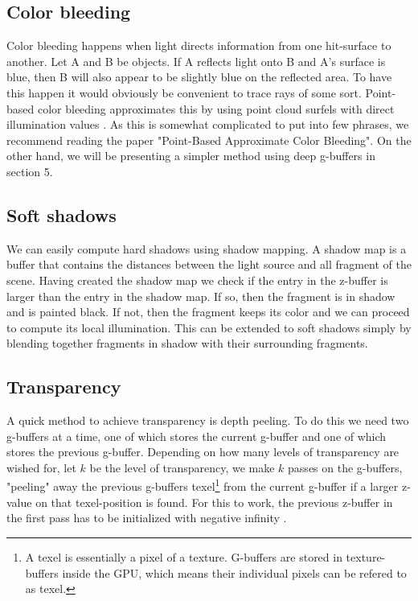 \documentclass{ACGSeminar}
\begin{document}
	\subsection{Color bleeding}
		Color bleeding happens when light directs information from one hit-surface to another. Let A and B be objects. If A reflects light onto B and A's surface is blue, then B will also appear
		to be slightly blue on the reflected area. To have this happen it would obviously be convenient to trace rays of some sort. Point-based color bleeding approximates this by using point cloud surfels with direct illumination values \cite{PBCB}. As this is somewhat complicated to put into few phrases, we recommend reading the paper "Point-Based Approximate Color Bleeding". On the other hand, we will be presenting a simpler method using deep g-buffers in section 5.

	\subsection{Soft shadows}
		We can easily compute hard shadows using shadow mapping. A shadow map is a buffer that contains the distances between the light source and all fragment of the scene. Having created the shadow map we check if the entry in the z-buffer is larger than the entry in the shadow map. If so, then the fragment is in shadow and is painted black. If not, then the fragment keeps its color and we can proceed to compute its local illumination. This can be extended to soft shadows simply by blending together fragments in shadow with their surrounding fragments.

	\subsection{Transparency}
		A quick method to achieve transparency is depth peeling. To do this we need two g-buffers at a time, one of which stores the current g-buffer and one of which stores the previous g-buffer. Depending on how many levels of transparency are wished for, let $k$ be the level of transparency, we make $k$ passes on the g-buffers, "peeling" away the previous g-buffers texel\footnote{A texel is essentially a pixel of a texture. G-buffers are stored in texture-buffers inside the GPU, which means their individual pixels can be refered to as texel.} from the current g-buffer if a larger z-value on that texel-position is found. For this to work, the previous z-buffer in the first pass has to be initialized with negative infinity \cite{NOIT}.
\end{document}
